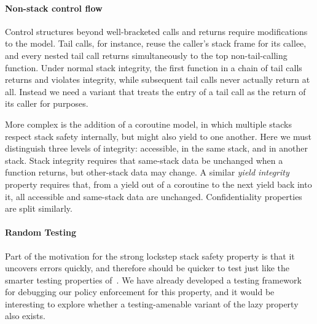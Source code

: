 \documentclass[acmsmall,review,anonymous]{acmart}\settopmatter{printfolios=true,printccs=false,printacmref=false}
\begin{document}
{{  \paragraph{Non-stack control flow}

    Control structures beyond well-bracketed calls and returns require
    modifications to the model. Tail calls, for instance, reuse the caller's
    stack frame for its callee, and every nested tail call returns
    simultaneously to the top non-tail-calling function. Under normal stack
    integrity, the first function in a chain of tail calls returns and violates
    integrity, while subsequent tail calls never actually return at all.
    Instead we need a variant that treats the entry of a tail call as the
    return of its caller for purposes.

    More complex is the addition of a coroutine model, in which multiple stacks
    respect stack safety internally, but might also yield to one another.
    Here we must distinguish three levels of integrity: accessible, in the same
    stack, and in another stack. Stack integrity requires that same-stack data
    be unchanged when a function returns, but other-stack data may change. A
    similar {\em yield integrity} property requires that, from a yield out of
    a coroutine to the next yield back into it, all accessible and same-stack
    data are unchanged. Confidentiality properties are split similarly.

  \paragraph{Random Testing}

  Part of the motivation for the strong lockstep stack safety property
  is that it uncovers errors quickly, and therefore should be quicker
  to test just like the smarter testing properties
  of~\citet{TestingNI:ICFP}. We have already developed a testing
  framework for debugging our policy enforcement for this property, and
  it would be interesting to explore whether a testing-amenable variant
  of the lazy property also exists.

}}
\end{document}

